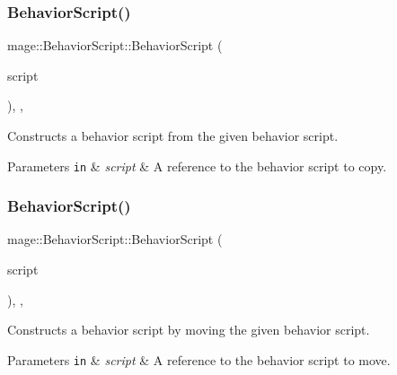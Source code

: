 \subsubsection{\texorpdfstring{Behavior\+Script()}{BehaviorScript()}\hspace{0.1cm}{\footnotesize\ttfamily [2/3]}}
{\footnotesize\ttfamily mage\+::\+Behavior\+Script\+::\+Behavior\+Script (\begin{DoxyParamCaption}\item[{const \mbox{\hyperlink{classmage_1_1_behavior_script}{Behavior\+Script}} \&}]{script }\end{DoxyParamCaption})\hspace{0.3cm}{\ttfamily [protected]}, {\ttfamily [default]}, {\ttfamily [noexcept]}}

Constructs a behavior script from the given behavior script.


\begin{DoxyParams}[1]{Parameters}
\mbox{\tt in}  & {\em script} & A reference to the behavior script to copy. \\
\hline
\end{DoxyParams}
\mbox{\label{classmage_1_1_behavior_script_abae69e797a05fa2cd1c3b7704f1c6767}} 
\subsubsection{\texorpdfstring{Behavior\+Script()}{BehaviorScript()}\hspace{0.1cm}{\footnotesize\ttfamily [3/3]}}
{\footnotesize\ttfamily mage\+::\+Behavior\+Script\+::\+Behavior\+Script (\begin{DoxyParamCaption}\item[{\mbox{\hyperlink{classmage_1_1_behavior_script}{Behavior\+Script}} \&\&}]{script }\end{DoxyParamCaption})\hspace{0.3cm}{\ttfamily [protected]}, {\ttfamily [default]}, {\ttfamily [noexcept]}}

Constructs a behavior script by moving the given behavior script.


\begin{DoxyParams}[1]{Parameters}
\mbox{\tt in}  & {\em script} & A reference to the behavior script to move. \\
\hline
\end{DoxyParams}


